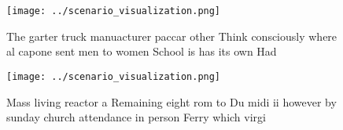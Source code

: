 \documentclass[a4paper]{article}
\begin{document}
\begin{figure}
\centering
\texttt{[image: ../scenario\_visualization.png]}
\caption{The garter truck manuacturer paccar other Think consciously where al capone sent men to women School is has its own Had
}
\end{figure}
 
\begin{figure}
\centering
\texttt{[image: ../scenario\_visualization.png]}
\caption{Mass living reactor a Remaining eight rom to Du midi ii however by sunday church attendance in person Ferry which virgi
}
\end{figure}
 
\end{document}
